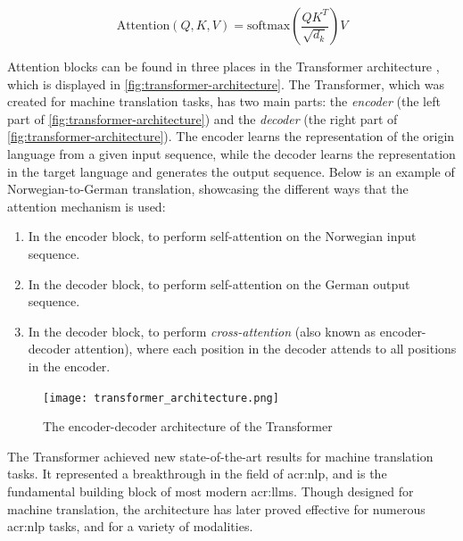 \begin{equation}
    \text{Attention}(Q, K, V) = \text{softmax}\left(\frac{QK^T}{\sqrt{d_k}}\right)V
    \label{eq:attention}
\end{equation}


Attention blocks can be found in three places in the Transformer architecture \citep[5]{vaswaniAttentionAllYou2017}, which is displayed in \autoref{fig:transformer-architecture}. The Transformer, which was created for machine translation tasks, has two main parts: the \textit{encoder} (the left part of \autoref{fig:transformer-architecture}) and the \textit{decoder} (the right part of \autoref{fig:transformer-architecture}). The encoder learns the representation of the origin language from a given input sequence, while the decoder learns the representation in the target language and generates the output sequence. Below is an example of Norwegian-to-German translation, showcasing the different ways that the attention mechanism is used:

\begin{enumerate}
    \item In the encoder block, to perform self-attention on the Norwegian input sequence.
    \item In the decoder block, to perform self-attention on the German output sequence.
    \item In the decoder block, to perform \textit{cross-attention} (also known as encoder-decoder attention), where each position in the decoder attends to all positions in the encoder.
\end{enumerate}

\begin{figure}
    \centering
    \texttt{[image: transformer\_architecture.png]}
    \caption[The encoder-decoder architecture of the Transformer]{The encoder-decoder architecture of the Transformer \citep[3]{vaswaniAttentionAllYou2017}}
    \label{fig:transformer-architecture}
\end{figure}

The Transformer achieved new state-of-the-art results for machine translation tasks. It represented a breakthrough in the field of \gls{acr:nlp}, and is the fundamental building block of most modern \glspl{acr:llm}. Though designed for machine translation, the architecture has later proved effective for numerous \acrshort{acr:nlp} tasks, and for a variety of modalities.


